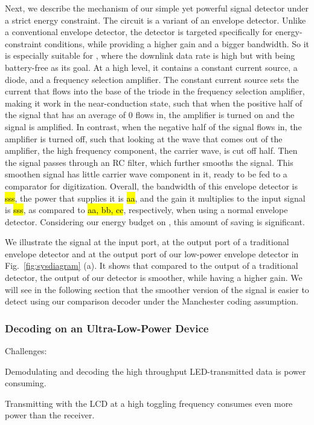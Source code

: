 Next, we describe the mechanism of our simple yet powerful signal detector under a strict energy constraint. The circuit is a variant of an envelope detector. Unlike a conventional envelope detector, the detector is targeted specifically for energy-constraint conditions, while providing a higher gain and a bigger bandwidth. So it is especially suitable for \vitag, where the downlink data rate is high but with being battery-free as its goal. At a high level, it contains a constant current source, a diode, and a frequency selection amplifier. The constant current source sets the current that flows into the base of the triode in the frequency selection amplifier, making it work in the near-conduction state, such that when the positive half of the signal that has an average of 0 flows in, the amplifier is turned on and the signal is amplified. In contrast, when the negative half of the signal flows in, the amplifier is turned off, such that looking at the wave that comes out of the amplifier, the high frequency component, the carrier wave, is cut off half. Then the signal passes through an RC filter, which further smooths the signal. This smoothen signal has little carrier wave component in it, ready to be fed to a comparator for digitization. Overall, the bandwidth of this envelope detector is \hl{sss}, the power that supplies it is \hl{aa}, and the gain it multiplies to the input signal is \hl{sss}, as compared to \hl{aa, bb, cc}, respectively, when using a normal envelope detector. Considering our energy budget on \vitag, this amount of saving is significant. 

We illustrate the signal at the input port, at the output port of a traditional envelope detector and at the output port of our low-power envelope detector in Fig.~\ref{fig:sysdiagram} (a). It shows that compared to the output of a traditional detector, the output of our detector is smoother, while having a higher gain. We will see in the following section that the smoother version of the signal is easier to detect using our comparison decoder under the Manchester coding assumption.

\subsubsection{Decoding on an Ultra-Low-Power Device}

Challenges:
\begin{Itemize}
\item Demodulating and decoding the high throughput LED-transmitted data is power consuming. 
\item Transmitting with the LCD at a high toggling frequency consumes even more power than the receiver.
\end{Itemize}


